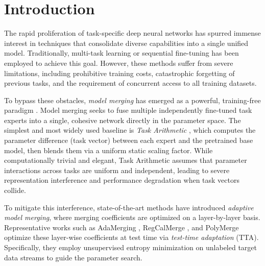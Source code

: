 \section{Introduction}
\label{sec:intro}

The rapid proliferation of task-specific deep neural networks has spurred immense interest in techniques that consolidate diverse capabilities into a single unified model. Traditionally, multi-task learning or sequential fine-tuning has been employed to achieve this goal. However, these methods suffer from severe limitations, including prohibitive training costs, catastrophic forgetting of previous tasks, and the requirement of concurrent access to all training datasets. 

To bypass these obstacles, \emph{model merging} has emerged as a powerful, training-free paradigm \cite{langley00, mitchell80}. Model merging seeks to fuse multiple independently fine-tuned task experts into a single, cohesive network directly in the parameter space. The simplest and most widely used baseline is \emph{Task Arithmetic} \cite{ilharco2022editing}, which computes the parameter difference (task vector) between each expert and the pretrained base model, then blends them via a uniform static scaling factor. While computationally trivial and elegant, Task Arithmetic assumes that parameter interactions across tasks are uniform and independent, leading to severe representation interference and performance degradation when task vectors collide.

To mitigate this interference, state-of-the-art methods have introduced \emph{adaptive model merging}, where merging coefficients are optimized on a layer-by-layer basis. Representative works such as AdaMerging \cite{yang2023adamerging}, RegCalMerge \cite{regcalmerge}, and PolyMerge \cite{polymerge} optimize these layer-wise coefficients at test time via \emph{test-time adaptation} (TTA). Specifically, they employ unsupervised entropy minimization on unlabeled target data streams to guide the parameter search. 

